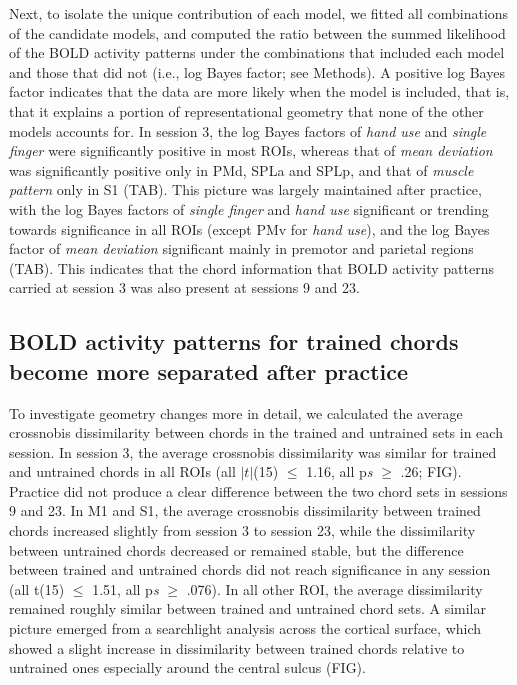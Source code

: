 \documentclass{article}
\begin{document}
Next, to isolate the unique contribution of each model, we fitted all combinations of the candidate models, and computed the ratio between the summed likelihood of the BOLD activity patterns under the combinations that included each model and those that did not (i.e., log Bayes factor; see Methods). A positive log Bayes factor indicates that the data are more likely when the model is included, that is, that it explains a portion of representational geometry that none of the other models accounts for. In session 3, the log Bayes factors of \textit{hand use} and \textit{single finger} were significantly positive in most ROIs, whereas that of \textit{mean deviation} was significantly positive only in PMd, SPLa and SPLp, and that of \textit{muscle pattern} only in S1 (TAB). This picture was largely maintained after practice, with the log Bayes factors of \textit{single finger} and \textit{hand use} significant or trending towards significance in all ROIs (except PMv for \textit{hand use}), and the log Bayes factor of \textit{mean deviation} significant mainly in premotor and parietal regions (TAB). This indicates that the chord information that BOLD activity patterns carried at session 3 was also present at sessions 9 and 23.\\

\subsection{BOLD activity patterns for trained chords become more separated after practice}

 To investigate geometry changes more in detail, we calculated the average crossnobis dissimilarity between chords in the trained and untrained sets in each session. In session 3, the average crossnobis dissimilarity was similar for trained and untrained chords in all ROIs (all $|t|$(15) $\leq$ 1.16, all p\textit{s} $\geq$ .26; FIG). Practice did not produce a clear difference between the two chord sets in sessions 9 and 23. In M1 and S1, the average crossnobis dissimilarity between trained chords increased slightly from session 3 to session 23, while the dissimilarity between untrained chords decreased or remained stable, but the difference between trained and untrained chords did not reach significance in any session (all t(15) $\leq$ 1.51, all p\textit{s} $\geq$ .076). In all other ROI, the average dissimilarity remained roughly similar between trained and untrained chord sets. A similar picture emerged from a searchlight analysis across the cortical surface, which showed a slight increase in dissimilarity between trained chords relative to untrained ones especially around the central sulcus (FIG). \\
\end{document}
